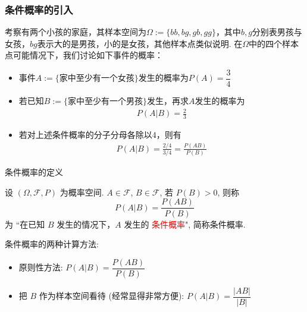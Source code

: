 \documentclass[Prob-All.tex]{subfiles}
\begin{document}
\begin{frame}
	\frametitle{条件概率的引入}
	\begin{exam}
		考察有两个小孩的家庭，其样本空间为$\Omega:=\{bb,bg,gb,gg\}$，其中$b, g$分别表男孩与女孩，$bg$表示大的是男孩，小的是女孩，其他样本点类似说明. 在$\Omega$中的四个样本点可能情况下，我们讨论如下事件的概率：
		\vspace{0.2cm}
		\begin{itemize}[<+-|alert@+>]
			\item 事件$A:=\{\mbox{家中至少有一个女孩}\}$发生的概率为$P(A)=\dfrac{3}{4}$
			\item 若已知$B:=\{\mbox{家中至少有一个男孩}\}$发生，再求$A$发生的概率为
			\begin{eqnarray*}
				P(A|B)=\frac{2}{3}
			\end{eqnarray*}
			\item 若对上述条件概率的分子分母各除以4，则有
			\begin{eqnarray*}
				P(A|B)=\frac{2/4}{3/4}=\frac{P(AB)}{P(B)}
			\end{eqnarray*}
		\end{itemize}
	\end{exam}

	\end{frame}

\begin{frame}{条件概率的定义}
	\begin{defi}
		设 $(\Omega,\mathcal{F},P)$ 为概率空间. $A\in\mathcal{F}$, $B\in\mathcal{F}$, 若 $P (B)>0$, 则称 $$P (A|B)=\frac{P (AB)}{P (B)}$$ 为 ``在已知 $B$ 发生的情况下，$A$ 发生的 \textcolor{red}{条件概率}", 简称条件概率.
	\end{defi}
	\pause
	\vspace{0.4cm}
	\begin{rmk} 条件概率的两种计算方法:
		\begin{itemize}[<+-|alert@+>]
			\item 原则性方法: $P (A|B)=\dfrac{P (AB)}{P (B)}$
			\item 把 $B$ 作为样本空间看待 (经常显得非常方便): $P (A|B)=\dfrac{|AB|}{|B|}$
		\end{itemize}
	\end{rmk}
\end{frame}
\end{document}
